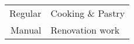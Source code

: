 %
%
%

\begin{tabular}{rl}
    Regular & Cooking \& Pastry \\
    Manual & Renovation work \\
\end{tabular}
